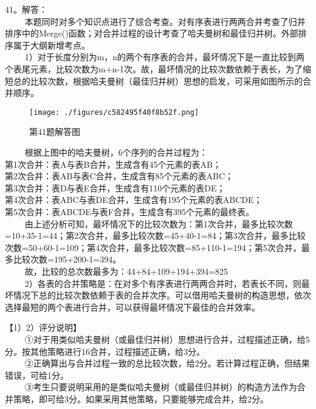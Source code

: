 41。解答：\\
$\qquad$ 本题同时对多个知识点进行了综合考查。对有序表进行两两合并考查了归并排序中的Merge()函数；对合并过程的设计考查了哈夫曼树和最佳归并树。外部排序属于大纲新增考点。\\
$\qquad$ 1）对于长度分别为m，n的两个有序表的合并，最坏情况下是一直比较到两个表尾元素，比较次数为m+n-1次。故，最坏情况的比较次数依赖于表长，为了缩短总的比较次数，根据哈夫曼树（最佳归并树）思想的启发，可采用如图所示的合并顺序。
\begin{figure}[ht]
\centering
\texttt{[image: ./figures/c582495f40f8b52f.png]}
\caption{第41题解答图} \label{fig_CSN12_16}
\end{figure}
$\qquad$ 根据上图中的哈夫曼树，6个序列的合并过程为：\\
第1次合并：表A与表B合并，生成含有45个元素的表AB；\\
第2次合并：表AB与表C合并，生成含有85个元素的表ABC；\\
第3次合并：表D与表E合并，生成含有110个元素的表DE；\\
第4次合并：表ABC与表DE合并，生成含有195个元素的表ABCDE；\\
第5次合并：表ABCDE与表F合并，生成含有395个元素的最终表。\\
$\qquad$ 由上述分析可知，最坏情况下的比较次数为：第1次合并，最多比较次数=10+35-1=44；第2次合并，最多比较次数=45+40-1=84；第3次合并，最多比较次数=50+60-1=109；第4次合并，最多比较次数=85+110-1=194；第5次合并，最多比较次数=195+200-1=394。\\
$\qquad$ 故，比较的总次数最多为：44+84+109+194+394=825 \\
$\qquad$ 2）各表的合并策略是：在对多个有序表进行两两合并时，若表长不同，则最坏情况下总的比较次数依赖于表的合并次序。可以借用哈夫曼树的构造思想，依次选择最短的两个表进行合并，可以获得最坏情况下最佳的合并效率。

【1）2）评分说明】\\
$\qquad$ ①对于用类似哈夫曼树（或最佳归并树）思想进行合并，过程描述正确，给5分。按其他策略进行16合并，过程描述正确，给3分。\\
$\qquad$ ②正确算出与合并过程一致的总比较次数，给2分。若计算过程正确，但结果错误，可给1分。\\
$\qquad$ ③考生只要说明采用的是类似哈夫曼树（或最佳归并树）的构造方法作为合并策略，即可给3分。如果采用其他策略，只要能够完成合并，给2分。

